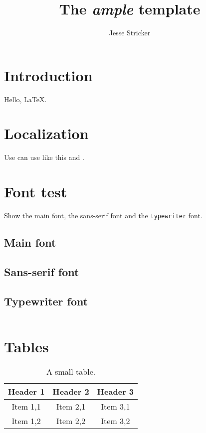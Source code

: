 \documentclass[article,english]{template/ample}
\title{The \emph{ample} template}
\author{Jesse Stricker}
\begin{document}
\maketitle
\tableofcontents

\section{Introduction}

Hello, \LaTeX.

\section{Localization}

Use can use  like this and .

\section{Font test}

Show the main font, the \textsf{sans-serif} font and the \texttt{typewriter}
font.

\subsection{Main font}

\blindtext{}

\subsection{Sans-serif font}

{\sffamily\blindtext{}}

\subsection{Typewriter font}

\begin{listing}[H]
  \inputminted{rust}{code-snippet.rs}
\end{listing}

\section{Tables}

\begin{table}[H]
  \centering
  \begin{tabular}{ccc} \toprule
    Header 1 & Header 2 & Header 3 \\ \midrule
    Item 1,1 & Item 2,1 & Item 3,1 \\
    Item 1,2 & Item 2,2 & Item 3,2 \\ \bottomrule
  \end{tabular}
  \caption{A small table.\label{tab:small}}
\end{table}
\end{document}
